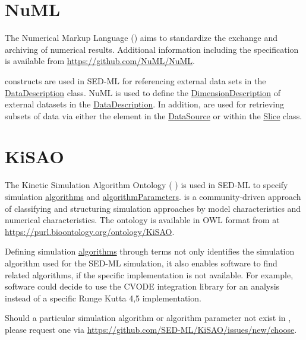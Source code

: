 \section{NuML}
\label{sec:numl}
The Numerical Markup Language () aims to standardize the exchange and archiving of numerical results. Additional information including the  specification is available from \url{https://github.com/NuML/NuML}.

 constructs are used in SED-ML for referencing external data sets in the \hyperref[class:dataDescription]{DataDescription} class. NuML is used to define the \hyperref[sec:dimensionDescription]{DimensionDescription} of external datasets in the \hyperref[class:dataDescription]{DataDescription}. In addition, \hyperref[type:numlsid]{} are used for retrieving subsets of data via either the \hyperref[sec:indexSet]{} element in the \hyperref[class:dataSource]{DataSource} or within the \hyperref[class:slice]{Slice} class.

\section{KiSAO}
\label{sec:kisao}
The Kinetic Simulation Algorithm Ontology ( \citep{CWK+10}) is used in SED-ML to specify simulation \hyperref[class:algorithm]{algorithms} and \hyperref[class:algorithmParameter]{algorithmParameters}.  is a community-driven approach of classifying and structuring simulation approaches by model characteristics and numerical characteristics. The ontology is available in OWL format from  at \url{https://purl.bioontology.org/ontology/KiSAO}. 

Defining simulation \hyperref[class:algorithm]{algorithms} through  terms not only identifies the simulation algorithm used for the SED-ML simulation, it also enables software to find related algorithms, if the specific implementation is not available. For example, software could decide to use the CVODE integration library for an analysis instead of a specific Runge Kutta 4,5 implementation. 

Should a particular simulation algorithm or algorithm parameter not exist in , please request one via \url{https://github.com/SED-ML/KiSAO/issues/new/choose}.


